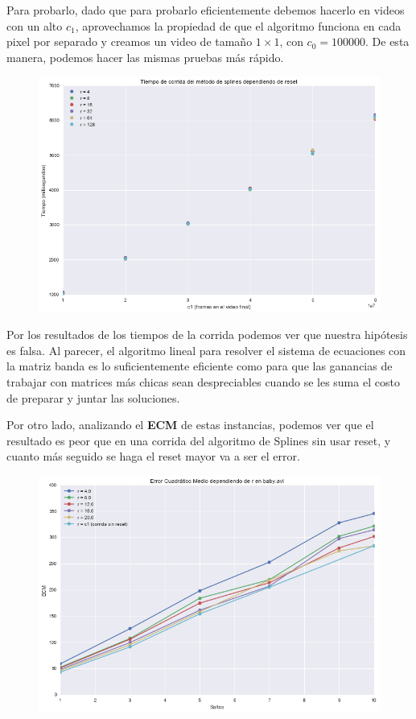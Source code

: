 Para probarlo, dado que para probarlo eficientemente debemos hacerlo en videos
con un alto $c_1$, aprovechamos la propiedad de que el algoritmo funciona en
cada pixel por separado y creamos un video de tama\~no $1 \times 1$, con $c_0 =
100000$. De esta manera, podemos hacer las mismas pruebas m\'as r\'apido.

\begin{figure}[H]
\centering
\includegraphics[width=.95\textwidth]{graficos/tiempo_reset.png}
\end{figure}

Por los resultados de los tiempos de la corrida podemos ver que nuestra
hip\'otesis es falsa. Al parecer, el algoritmo lineal para resolver el sistema
de ecuaciones con la matriz banda es lo suficientemente eficiente como para que
las ganancias de trabajar con matrices m\'as chicas sean despreciables cuando se
les suma el costo de preparar y juntar las soluciones.

Por otro lado, analizando el \textbf{ECM} de estas instancias, podemos ver que
el resultado es peor que en una corrida del algoritmo de Splines sin usar reset,
y cuanto m\'as seguido se haga el reset mayor va a ser el error.

\begin{figure}[H]
\centering
\includegraphics[width=.95\textwidth]{graficos/ecm_reset.png}
\end{figure}

